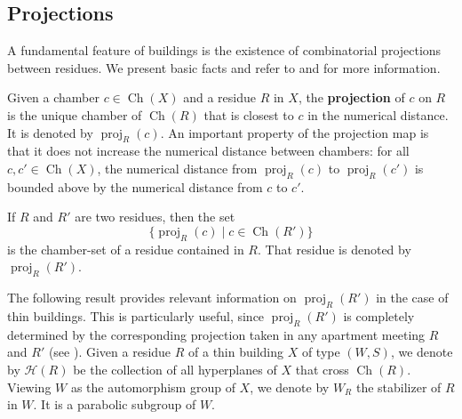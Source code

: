 \documentclass[12pt,a4paper]{amsproc}
\theoremstyle{definition}
\DeclareMathOperator{\Ch}{Ch}
\DeclareMathOperator{\proj}{proj}
\begin{document}
\subsection{Projections}

A fundamental feature of buildings is the existence of combinatorial projections between residues. We present basic facts and refer to  \cite[\S 3.19]{Tits74} and \cite[\S2]{CapRAB} for more information.

Given a chamber $c \in \Ch(X)$ and a residue $R$ in $X$, the \textbf{projection} of $c$ on $R$ is the unique chamber of $\Ch(R)$ that is closest to $c$ in the numerical distance. 
It is denoted by $\proj_R(c)$. An important property of the projection map is that it does not increase the numerical distance between chambers: for all $c, c' \in \Ch(X)$, the numerical distance from $\proj_R(c)$ to $\proj_R(c')$ is bounded above by the numerical distance from $c$ to $c'$. 

If $R$ and $R'$ are two residues, then the set 
$$\{\proj_R(c) \; | \; c \in \Ch(R')\}$$
is the chamber-set of a residue contained in $R$. That residue is denoted by $\proj_R(R')$. 

The following result provides relevant information on $\proj_R(R')$ in the case of thin buildings. This is particularly useful, since $\proj_R(R')$ is completely determined by the corresponding projection taken in any apartment meeting $R$ and $R'$ (see \cite[\S 3.19]{Tits74}). Given a residue $R$ of a thin building $X$ of type $(W, S)$, we denote by $\mathcal H(R) $ be the collection of all hyperplanes of  $X$ that cross   $\Ch(R)$. Viewing $W$ as the automorphism group of $X$, we denote by $W_R$ the stabilizer of $R$ in $W$. It is a parabolic subgroup of $W$. 
\end{document}
